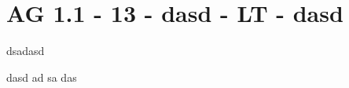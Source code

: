 \section{AG 1.1 - 13 - dasd - LT - dasd}

\begin{beispiel}{2} %

dsadasd

dasd
ad
sa
das


\end{beispiel}